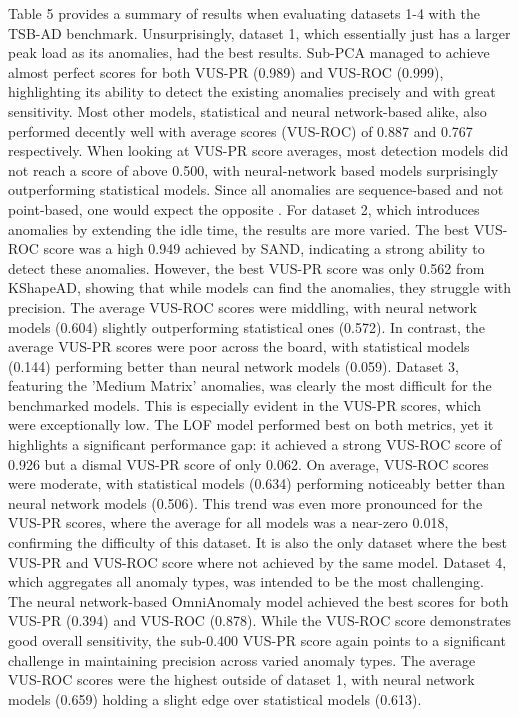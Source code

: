 \documentclass[12pt,oneside]{article}
\begin{document}
Table 5 provides a summary of results when evaluating datasets 1-4 with the TSB-AD benchmark.
Unsurprisingly, dataset 1, which essentially just has a larger peak load as its anomalies, had the best results. Sub-PCA managed to achieve almost perfect scores for both VUS-PR (0.989) and VUS-ROC (0.999), highlighting its ability to detect the existing anomalies precisely and with great sensitivity. Most other models, statistical and neural network-based alike, also performed decently well with average scores (VUS-ROC) of 0.887 and 0.767 respectively.
When looking at VUS-PR score averages, most detection models did not reach a score of above 0.500, with neural-network based models surprisingly outperforming statistical models. Since all anomalies are sequence-based and not point-based, one would expect the opposite \parencites[p.~10]{liu2024elephant}[p.~1706]{paparrizos2022tsb}.
For dataset 2, which introduces anomalies by extending the idle time, the results are more varied. The best VUS-ROC score was a high 0.949 achieved by SAND, indicating a strong ability to detect these anomalies. However, the best VUS-PR score was only 0.562 from KShapeAD, showing that while models can find the anomalies, they struggle with precision. The average VUS-ROC scores were middling, with neural network models (0.604) slightly outperforming statistical ones (0.572). In contrast, the average VUS-PR scores were poor across the board, with statistical models (0.144) performing better than neural network models (0.059).
Dataset 3, featuring the 'Medium Matrix' anomalies, was clearly the most difficult for the benchmarked models. This is especially evident in the VUS-PR scores, which were exceptionally low. The LOF model performed best on both metrics, yet it highlights a significant performance gap: it achieved a strong VUS-ROC score of 0.926 but a dismal VUS-PR score of only 0.062. On average, VUS-ROC scores were moderate, with statistical models (0.634) performing noticeably better than neural network models (0.506). This trend was even more pronounced for the VUS-PR scores, where the average for all models was a near-zero 0.018, confirming the difficulty of this dataset. It is also the only dataset where the best VUS-PR and VUS-ROC score where not achieved by the same model.
Dataset 4, which aggregates all anomaly types, was intended to be the most challenging. The neural network-based OmniAnomaly model achieved the best scores for both VUS-PR (0.394) and VUS-ROC (0.878). While the VUS-ROC score demonstrates good overall sensitivity, the sub-0.400 VUS-PR score again points to a significant challenge in maintaining precision across varied anomaly types. The average VUS-ROC scores were the highest outside of dataset 1, with neural network models (0.659) holding a slight edge over statistical models (0.613).
\end{document}
